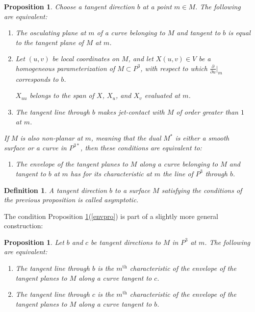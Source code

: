 \documentclass[11pt]{article}
\numberwithin{equation}{section}
\newcounter{count}
\theoremstyle{plain}
\newtheorem{definition}[count]{Definition}
\newtheorem{proposition}[count]{Proposition}
\theoremstyle{remark}
\newcommand{\D}{\partial}
\begin{document}
\begin{proposition} \label{asympprops}Choose a tangent direction $b$ at a point $m\in M$. The following are equivalent:
\begin{enumerate}
\itemsep0em 
\item{The osculating plane at $m$ of a curve belonging to $M$ and tangent to $b$ is equal to the tangent plane of $M$ at $m$.}
\item{Let $(u,v)$ be local coordinates on $M$, and let $X(u,v)\in V$ be a homogeneous parameterization of $M\subset  P^{3}$, with respect to which $\frac{\D}{\D u}|_m$ corresponds to $b$.

$X_{uu}$ belongs to the span of $X$, $X_u$, and $X_v$ evaluated at $m$.}
\item{The tangent line through $b$ makes jet-contact with $M$ of order greater than $1$ at $m$.}
\end{enumerate}

If $M$ is also non-planar at $m$, meaning that the dual $M^{*}$ is either a smooth surface or a curve in $P^{3*}$, then these conditions are equivalent to:
\begin{enumerate}
\itemsep0em
\setcounter{enumi}{3}
\item{\label{envpro}The envelope of the tangent planes to $M$ along a curve belonging to $M$ and tangent to $b$ at $m$ has for its characteristic at $m$ the line of $ P^{3}$ through $b$.}
\end{enumerate}
\end{proposition}

\begin{definition} A tangent direction $b$ to a surface $M$ satisfying the conditions of the previous proposition is called \emph{asymptotic}.
\end{definition}

The condition Proposition \ref{asympprops}(\ref{envpro}) is part of a slightly more general construction:

\begin{proposition}\label{conjeq} Let $b$ and $c$ be tangent directions to $M$ in $P^3$ at $m$. The following are equivalent:
\begin{enumerate}
\itemsep0em 
\item{The tangent line through $b$ is the $m^{\text{th}}$ characteristic of the envelope of the tangent planes to $M$ along a curve tangent to $c$.}
\item{The tangent line through $c$ is the $m^{\text{th}}$ characteristic of the envelope of the tangent planes to $M$ along a curve tangent to $b$.}
\end{enumerate}
\end{proposition}
\end{document}
